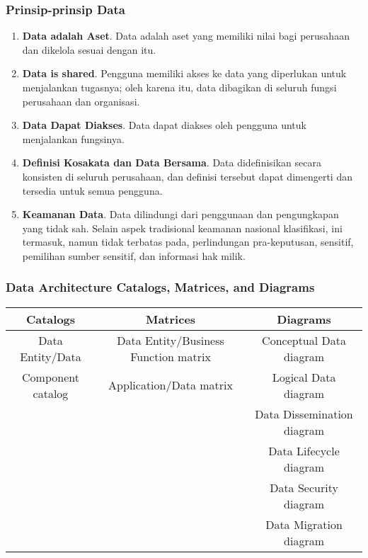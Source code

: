 \documentclass[aspectratio=169]{beamer}
\begin{document}
	\begin{frame}
		\frametitle{Prinsip-prinsip Data}
		\begin{enumerate}
			\item \textbf{Data adalah Aset}.
			Data adalah aset yang memiliki nilai bagi perusahaan dan dikelola sesuai dengan itu.
			\item \textbf{Data is shared}.
			Pengguna memiliki akses ke data yang diperlukan untuk menjalankan tugasnya; oleh karena itu, data dibagikan di seluruh fungsi perusahaan
			dan organisasi.
			\item \textbf{Data Dapat Diakses}. Data dapat diakses oleh pengguna untuk menjalankan fungsinya.
			\item \textbf{Definisi Kosakata dan Data Bersama}. Data didefinisikan secara konsisten di seluruh perusahaan, dan definisi tersebut dapat dimengerti dan tersedia untuk semua pengguna.
			\item \textbf{Keamanan Data}.
			Data dilindungi dari penggunaan dan pengungkapan yang tidak sah. Selain aspek tradisional keamanan nasional
			klasifikasi, ini termasuk, namun tidak terbatas pada, perlindungan pra-keputusan, sensitif, pemilihan sumber sensitif, dan
			informasi hak milik.
		\end{enumerate}
	\end{frame}
	
	\begin{frame}
		\frametitle{ Data Architecture Catalogs, Matrices, and Diagrams}
		\begin{table}[]
			\begin{tabular}{|c|c|c|}
				\hline
				\textbf{Catalogs} & \textbf{Matrices}   & \textbf{Diagrams} \\ \hline
				Data Entity/Data                   & Data Entity/Business Function matrix & Conceptual Data diagram            \\ 
				Component catalog                  & Application/Data matrix              & Logical Data diagram               \\
				&                                      & Data Dissemination diagram         \\
				&                                      & Data Lifecycle diagram             \\
				&                                      & Data Security diagram              \\
				&                                      & Data Migration diagram             \\ \hline
			\end{tabular}
		\end{table}
	\end{frame}
	
\end{document}

